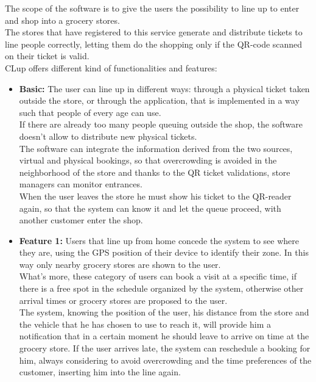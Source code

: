 \documentclass[]{article}
\begin{document}
		\begin{paragraph}
			\newline
				The scope of the software is to give the users the possibility to line up to enter and shop into a grocery stores.\\
				The stores that have registered to this service generate and distribute tickets to line people correctly, letting them do the shopping only if the QR-code scanned on their ticket is valid.\\
				CLup offers different kind of functionalities and features:\\
	
			\begin{itemize}
			\item \textbf{Basic:}
				The user can line up in different ways: through a physical ticket taken outside the store, or through the application, that is implemented in a way such that people of every age can use. \\
				If there are already too many people queuing outside the shop, the software doesn’t allow to distribute new physical tickets. \\
				The software can integrate the information derived  from the two sources, virtual and physical bookings, so that overcrowding is avoided in the neighborhood of the store and thanks to the QR ticket validations, store managers can monitor entrances. \\
				When the user leaves the store he must show his ticket to the QR-reader again, so that the system can know it and let the queue proceed, with another customer enter the shop.\\

			\item \textbf{Feature 1:}
				Users that line up from home concede the system to see where they are, using the GPS position of their device to identify their zone. In this way only nearby grocery stores are shown to the user.\\
				What’s more, these category of users can book a visit at a specific time, if there is a free spot in the schedule organized by the system, otherwise other arrival times or grocery stores are proposed to the user.\\
				The system, knowing the position of the user, his distance from the store and the vehicle that he has chosen to use to reach it, will provide him a notification that in a certain moment he should leave to arrive on time at the grocery store. If the user arrives late, the system can reschedule a booking for him, always considering to avoid overcrowding and the time preferences of the customer, inserting him into the line again.\\


\end{itemize}
\end{paragraph}
\end{document}
